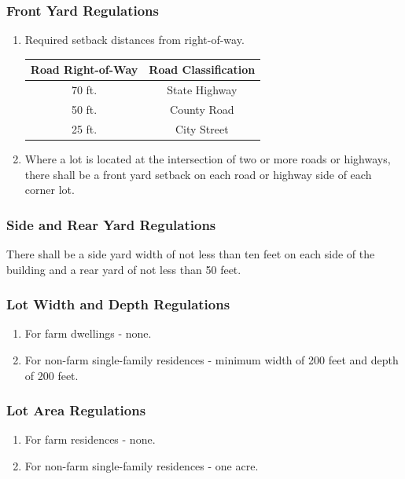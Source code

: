 \subsubsection{Front Yard Regulations}
\begin{enumerate}[{\indent}a)]
    \item Required setback distances from right-of-way.
        \begin{center}
        \begin{tabular}{|c|c|}
            \hline
            \textbf{Road Right-of-Way} & \textbf{Road Classification}\\
            \hline
            70 ft. & State Highway\\
            \hline
            50 ft. & County Road\\
            \hline
            25 ft. & City Street\\
            \hline
        \end{tabular}
        \end{center}
    \item Where a lot is located at the intersection of two or more roads or highways, there shall be a front yard setback on each road or highway side of each corner lot.
\end{enumerate}
\subsubsection{Side and Rear Yard Regulations}
There shall be a side yard width of not less than ten feet on each side of the building and a rear yard of not less than 50 feet.
\subsubsection{Lot Width and Depth Regulations}
\begin{enumerate}[{\indent}a)]
    \item For farm dwellings - none.
    \item For non-farm single-family residences - minimum width of 200 feet and depth of 200 feet.
\end{enumerate}
\subsubsection{Lot Area Regulations}
\begin{enumerate}[{\indent}a)]
    \item For farm residences - none.
    \item For non-farm single-family residences - one acre.
\end{enumerate}
